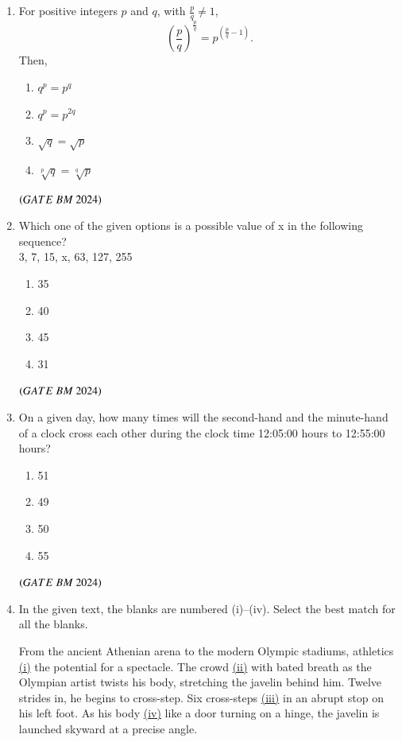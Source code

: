 \documentclass[journal,12pt,onecolumn]{IEEEtran}
\theoremstyle{remark}
\begin{document}
\begin{enumerate}
\item For positive integers $p$ and $q$, with $\tfrac{p}{q} \neq 1$,  
\[
\left(\frac{p}{q}\right)^{\tfrac{p}{q}} = p^{\left(\tfrac{p}{q} - 1\right)}.
\]  
Then,  

\begin{enumerate}[label=(\Alph*)] 
    \item $q^p = p^q$
    \item $q^p = p^{2q}$
    \item $\sqrt{q} = \sqrt{p}$
    \item $\sqrt[p]{q} = \sqrt[q]{p}$
\end{enumerate}
\hfill $\brak{GATE\ BM\ 2024}$

\item Which one of the given options is a possible value of x in the following sequence?\\

3, 7, 15, x, 63, 127, 255\\
\begin{enumerate}[label=(\Alph*)] 
    \item 35 
    \item 40
    \item45
    \item31
\end{enumerate}
\hfill $\brak{GATE\ BM\ 2024}$

\item On a given day, how many times will the second-hand and the minute-hand of a
clock cross each other during the clock time 12:05:00 hours to 12:55:00 hours?
\begin{enumerate}[label=(\Alph*)] 
    \item 51
    \item49
    \item50
    \item55
\end{enumerate}
\hfill $\brak{GATE\ BM\ 2024}$

\item In the given text, the blanks are numbered (i)--(iv). Select the best match for all the blanks.  

\medskip

From the ancient Athenian arena to the modern Olympic stadiums, athletics \underline{(i)} the potential for a spectacle. The crowd \underline{(ii)} with bated breath as the Olympian artist twists his body, stretching the javelin behind him. Twelve strides in, he begins to cross-step. Six cross-steps \underline{(iii)} in an abrupt stop on his left foot. As his body \underline{(iv)} like a door turning on a hinge, the javelin is launched skyward at a precise angle.  

\medskip


\end{enumerate}
\end{document}
